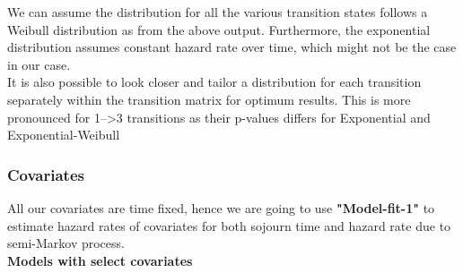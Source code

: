 \documentclass[11pt,a4paper]{article}
\begin{document}
We can assume the distribution for all the various transition states follows a Weibull distribution as from the above output. Furthermore, the exponential distribution assumes constant hazard rate over time, which might not be the case in our case.\\
It is also possible to look closer and tailor a distribution for each transition separately within the transition matrix for optimum results. This is more pronounced for 1-->3 transitions as their p-values differs for Exponential and Exponential-Weibull\\
\newpage
\subsubsection{Covariates}

All our covariates are time fixed, hence we are going to use \textbf{"Model-fit-1"} to estimate hazard rates of covariates for both sojourn time and hazard rate due to semi-Markov process.\\

\textbf{Models with select covariates}
\end{document}
